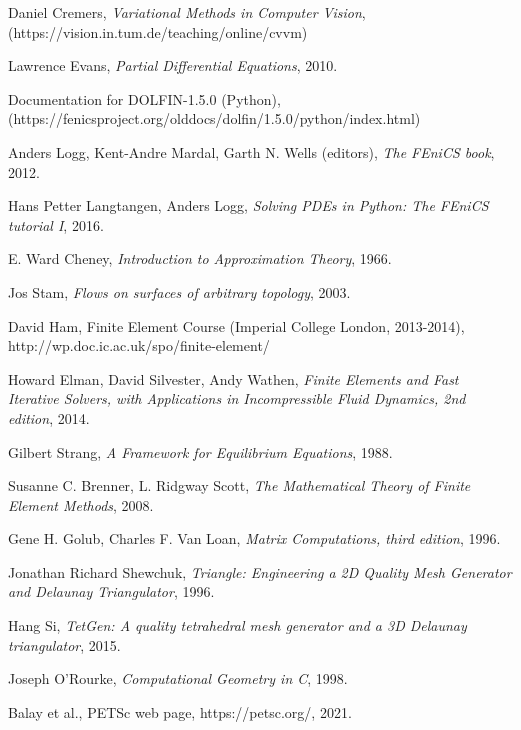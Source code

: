 \documentclass[11pt,a4paper]{memoir}
\begin{document}
\begin{thebibliography}{9}
Daniel Cremers,
\textit{Variational Methods in Computer Vision},
\\(https://vision.in.tum.de/teaching/online/cvvm)

Lawrence Evans,
\textit{Partial Differential Equations},
2010.

Documentation for DOLFIN-1.5.0 (Python),\\
(https://fenicsproject.org/olddocs/dolfin/1.5.0/python/index.html)

Anders Logg, Kent-Andre Mardal, Garth N. Wells (editors),
\textit{The FEniCS book},
2012.

Hans Petter Langtangen, Anders Logg,
\textit{Solving PDEs in Python: The FEniCS tutorial I},
2016.

E. Ward Cheney,
\textit{Introduction to Approximation Theory},
1966.

Jos Stam,
\textit{Flows on surfaces of arbitrary topology},
2003.

David Ham, Finite Element Course
(Imperial College London, 2013-2014),\\
http://wp.doc.ic.ac.uk/spo/finite-element/

Howard Elman, David Silvester, Andy Wathen,
\textit{Finite Elements and Fast Iterative Solvers, with Applications in Incompressible Fluid Dynamics, 2nd edition},
2014.

Gilbert Strang,
\textit{A Framework for Equilibrium Equations},
1988.

Susanne C. Brenner, L. Ridgway Scott,
\textit{The Mathematical Theory of Finite Element Methods},
2008.

Gene H. Golub, Charles F. Van Loan,
\textit{Matrix Computations, third edition},
1996.

Jonathan Richard Shewchuk,
\textit{Triangle: Engineering a 2D Quality Mesh Generator and Delaunay Triangulator},
1996.

Hang Si,
\textit{TetGen: A quality tetrahedral mesh generator and a 3D Delaunay triangulator},
2015.

Joseph O'Rourke,
\textit{Computational Geometry in C},
1998.

Balay et al.,
PETSc web page, https://petsc.org/,
2021.


\end{thebibliography}
\end{document}
